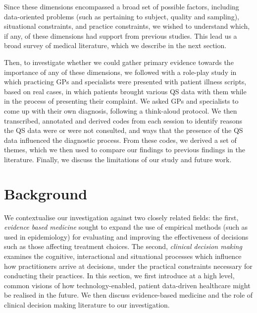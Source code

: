 \documentclass{sigchi}
\begin{document}
Since these dimensions encompassed a broad set of possible factors, including data-oriented problems (such as pertaining to subject, quality and sampling), situational constraints, and practice constraints, we wished to understand which, if any, of these dimensions had support from previous studies.  This lead us a broad survey of medical literature, which we describe in the next section.  

Then, to investigate whether we could gather primary evidence towards the importance of any of these dimensions, we followed with a role-play study in which practicing GPs and specialists were presented with patient illness scripts, based on real cases, in which patients brought various QS data with them while in the process of presenting their complaint.  We asked GPs and specialists to come up with their own diagnosis, following a think-aloud protocol.  We then transcribed, annotated and derived codes from each session to identify reasons the QS data were or were not consulted, and ways that the presence of the QS data influenced the diagnostic process.  From these codes, we derived a set of themes, which we then used to compare our findings to previous findings in the literature.  Finally, we discuss the limitations of our study and future work.






\section{Background} 

We contextualise our investigation against two closely related fields: the first, \emph{evidence based medicine} sought to expand the use of empirical methods (such as used in epidemiology) for evaluating and improving the effectiveness of decisions such as those affecting treatment choices.  The second, \emph{clinical decision making} examines the cognitive, interactional and situational processes which influence how practitioners arrive at decisions, under the practical constraints necessary for conducting their practices.  In this section, we first introduce at a high level, common visions of how technology-enabled, patient data-driven healthcare might be realised in the future.  We then discuss evidence-based medicine and the role of clinical decision making literature to our investigation.
\end{document}
